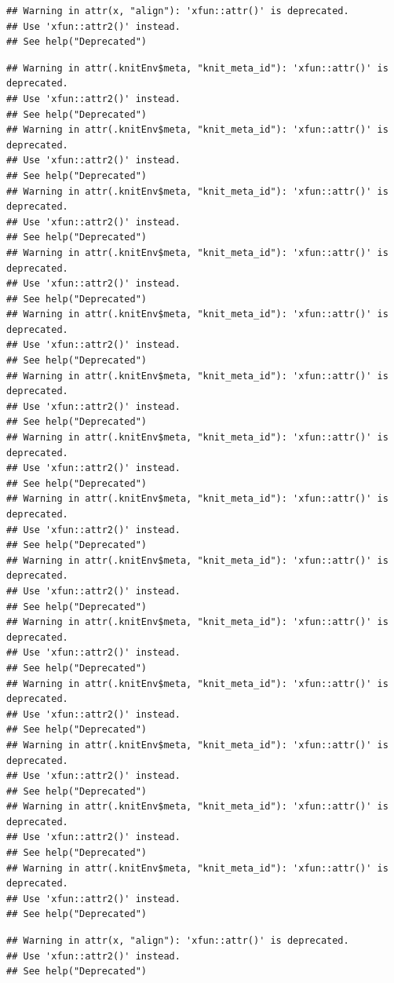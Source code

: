 \documentclass[
]{article}
\begin{document}
\begin{verbatim}
## Warning in attr(x, "align"): 'xfun::attr()' is deprecated.
## Use 'xfun::attr2()' instead.
## See help("Deprecated")
\end{verbatim}

\begin{verbatim}
## Warning in attr(.knitEnv$meta, "knit_meta_id"): 'xfun::attr()' is deprecated.
## Use 'xfun::attr2()' instead.
## See help("Deprecated")
## Warning in attr(.knitEnv$meta, "knit_meta_id"): 'xfun::attr()' is deprecated.
## Use 'xfun::attr2()' instead.
## See help("Deprecated")
## Warning in attr(.knitEnv$meta, "knit_meta_id"): 'xfun::attr()' is deprecated.
## Use 'xfun::attr2()' instead.
## See help("Deprecated")
## Warning in attr(.knitEnv$meta, "knit_meta_id"): 'xfun::attr()' is deprecated.
## Use 'xfun::attr2()' instead.
## See help("Deprecated")
## Warning in attr(.knitEnv$meta, "knit_meta_id"): 'xfun::attr()' is deprecated.
## Use 'xfun::attr2()' instead.
## See help("Deprecated")
## Warning in attr(.knitEnv$meta, "knit_meta_id"): 'xfun::attr()' is deprecated.
## Use 'xfun::attr2()' instead.
## See help("Deprecated")
## Warning in attr(.knitEnv$meta, "knit_meta_id"): 'xfun::attr()' is deprecated.
## Use 'xfun::attr2()' instead.
## See help("Deprecated")
## Warning in attr(.knitEnv$meta, "knit_meta_id"): 'xfun::attr()' is deprecated.
## Use 'xfun::attr2()' instead.
## See help("Deprecated")
## Warning in attr(.knitEnv$meta, "knit_meta_id"): 'xfun::attr()' is deprecated.
## Use 'xfun::attr2()' instead.
## See help("Deprecated")
## Warning in attr(.knitEnv$meta, "knit_meta_id"): 'xfun::attr()' is deprecated.
## Use 'xfun::attr2()' instead.
## See help("Deprecated")
## Warning in attr(.knitEnv$meta, "knit_meta_id"): 'xfun::attr()' is deprecated.
## Use 'xfun::attr2()' instead.
## See help("Deprecated")
## Warning in attr(.knitEnv$meta, "knit_meta_id"): 'xfun::attr()' is deprecated.
## Use 'xfun::attr2()' instead.
## See help("Deprecated")
## Warning in attr(.knitEnv$meta, "knit_meta_id"): 'xfun::attr()' is deprecated.
## Use 'xfun::attr2()' instead.
## See help("Deprecated")
## Warning in attr(.knitEnv$meta, "knit_meta_id"): 'xfun::attr()' is deprecated.
## Use 'xfun::attr2()' instead.
## See help("Deprecated")
\end{verbatim}

\begin{verbatim}
## Warning in attr(x, "align"): 'xfun::attr()' is deprecated.
## Use 'xfun::attr2()' instead.
## See help("Deprecated")
\end{verbatim}
\end{document}
